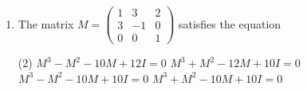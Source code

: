 \begin{enumerate}[label=\color{ocre}\textbf{\arabic*.}]
\begin{answer}
\begin{align*}
		\left(\begin{array}{ccc}0 & 0 & 1 \\ 0 & 1 & 0 \\ 1 & 0 & 0\end{array}\right)\left(\begin{array}{c}a \\ -2 a \\ a\end{array}\right)&=\left(\begin{array}{c}a \\ -2 a \\ a\end{array}\right)\text{ and } \left(\begin{array}{ccc}0 & 1 & 1 \\ 1 & 0 & 1 \\ 1 & 1 & 0\end{array}\right)\left(\begin{array}{c}a \\ -2 a \\ a\end{array}\right)\\&=\left(\begin{array}{c}-a \\ 2 a \\ -a\end{array}\right)=-1\left(\begin{array}{c}a \\ -2 a \\ a\end{array}\right)
		\intertext{For other combination above relation is not possible.}
		\end{align*}
		So the correct answer is \textbf{Option (B)}
	\end{answer}
	\item The matrix $M=\left(\begin{array}{ccc}1 & 3 & 2 \\ 3 & -1 & 0 \\ 0 & 0 & 1\end{array}\right)$ satisfies the equation
	{}
	\begin{tasks}(2)
		\task[\textbf{A.}] $M^{3}-M^{2}-10 M+12 I=0$
		\task[\textbf{B.}] $M^{3}+M^{2}-12 M+10 I=0$
		\task[\textbf{C.}] $M^{3}-M^{2}-10 M+10 I=0$
		\task[\textbf{D.}] $M^{3}+M^{2}-10 M+10 I=0$
	\end{tasks}
	\begin{answer}
		\begin{align*}

\end{align*}
\end{answer}
\end{enumerate}
